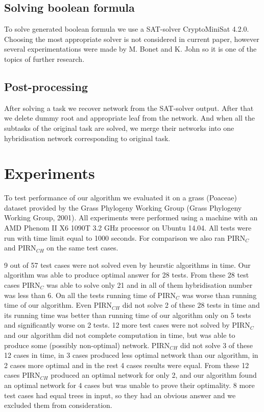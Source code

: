 \documentclass[runningheads, envcountsame, a4paper]{llncs}
\begin{document}
\subsection{Solving boolean formula}

To solve generated boolean formula we use a SAT-solver CryptoMiniSat 4.2.0. Choosing the most appropriate solver 
is not considered in current paper, however several experimentations were made by M. Bonet and K. John \cite {bonet2009efficiently} 
so it is one of the topics of further research.

\subsection{Post-processing}

After solving a task we recover network from the SAT-solver output. After that we delete dummy root and appropriate 
leaf from the network. And when all the subtasks of the original task are solved, we merge their networks into one 
hybridisation network corresponding to original task.

\section{Experiments}

To test performance of our algorithm we evaluated it on a grass (Poaceae) dataset provided by the Grass Phylogeny Working Group 
(Grass Phylogeny Working Group, 2001). All experiments were performed using a machine with an AMD Phenom II X6 1090T 3.2 GHz 
processor on Ubuntu 14.04. All tests were run with time limit equal to 1000 seconds. For comparison we also ran PIRN$_C$ and PIRN$_{CH}$ 
on the same test cases. 

9 out of 57 test cases were not solved even by heurstic algorithms in time. Our algorithm was able to produce optimal answer for 28
tests. From these 28 test cases PIRN$_C$ was able to solve only 21 and in all of them hybridisation number was less than 6. 
On all the tests running time of PIRN$_C$ was worse than running time of our algorithm.
Even PIRN$_{CH}$ did not solve 2 of these 28 tests in time and its running time was better than running time of our algorithm only
on 5 tests and significantly worse on 2 tests. 12 more test cases were not solved by PIRN$_C$ and our algorithm did not complete computation 
in time, but was able to produce some (possibly non-optimal) network. PIRN$_{CH}$ did not solve 3 of these 12 cases in time, in 3 cases 
produced less optimal network than our algorithm, in 2 cases more optimal and in the rest 4 cases results were equal. From these 12 cases PIRN$_{CH}$
produced an optimal network for only 2, and our algorithm found an optimal network for 4 cases but was unable to prove their optimality. 
8 more test cases had equal trees in input, so they had an obvious answer and we excluded them from consideration.
\end{document}
